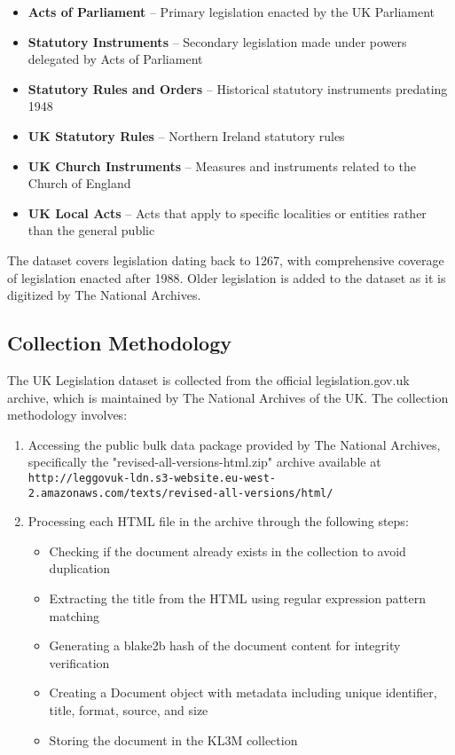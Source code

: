 \begin{itemize}
  \item \textbf{Acts of Parliament} -- Primary legislation enacted by the UK Parliament
  \item \textbf{Statutory Instruments} -- Secondary legislation made under powers delegated by Acts of Parliament
  \item \textbf{Statutory Rules and Orders} -- Historical statutory instruments predating 1948
  \item \textbf{UK Statutory Rules} -- Northern Ireland statutory rules
  \item \textbf{UK Church Instruments} -- Measures and instruments related to the Church of England
  \item \textbf{UK Local Acts} -- Acts that apply to specific localities or entities rather than the general public
\end{itemize}

The dataset covers legislation dating back to 1267, with comprehensive coverage of legislation enacted after 1988. Older legislation is added to the dataset as it is digitized by The National Archives.

\subsection{Collection Methodology}

The UK Legislation dataset is collected from the official legislation.gov.uk archive, which is maintained by The National Archives of the UK. The collection methodology involves:

\begin{enumerate}
    \item Accessing the public bulk data package provided by The National Archives, specifically the "revised-all-versions-html.zip" archive available at \texttt{http://leggovuk-ldn.s3-website.eu-west-2.amazonaws.com/texts/revised-all-versions/html/}
    
    \item Processing each HTML file in the archive through the following steps:
    \begin{itemize}
        \item Checking if the document already exists in the collection to avoid duplication
        \item Extracting the title from the HTML using regular expression pattern matching
        \item Generating a blake2b hash of the document content for integrity verification
        \item Creating a Document object with metadata including unique identifier, title, format, source, and size
        \item Storing the document in the KL3M collection
    \end{itemize}
\end{enumerate}


